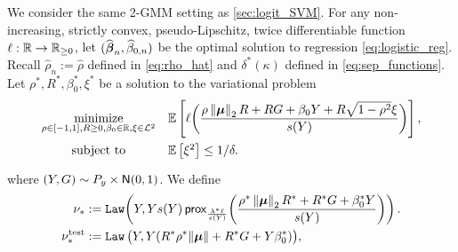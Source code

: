 We consider the same 2-GMM setting as \cref{sec:logit_SVM}. For any non-increasing, strictly convex, pseudo-Lipschitz, twice differentiable function $\ell: \mathbb{R} \to \mathbb{R}_{\ge 0}$, let $(\widehat {{\boldsymbol{\beta}}}_n, \widehat \beta_{0, n})$ be the optimal solution to regression \cref{eq:logistic_reg}. Recall $\hat \rho_n:= \hat \rho$ defined in \cref{eq:rho_hat} and $\delta^*(\kappa)$ defined in \cref{eq:sep_functions}. Let $\rho^*, R^*, \beta_0^*, \xi^*$ be a solution to the variational problem
    \begin{equation}\label{eq:logistic_variation}
    \begin{aligned}
        \begin{array}{cl}
            \underset{ \rho \in [-1, 1], R \ge 0, \beta_0 \in \mathbb{R},\xi \in \mathcal{L}^2 }{ \mathrm{minimize} }
            &
        \mathbb{E} \left[ \ell \biggl( \dfrac{ \rho\left\|{{\boldsymbol{\mu}}}\right\|_2 R + RG + \beta_0 Y + R\sqrt{1 - \rho^2} \xi }{s(Y)} \biggr) \right], \\
            \text{subject to} & \vphantom{\dfrac11} \mathbb{E} \left[ \xi^2 \right]  \le  1/\delta .
        \end{array}
    \end{aligned}
    \end{equation}
    where $(Y, G) \sim P_y \times {\sf N}(0,1)$. 
    We define
    \begin{equation*}
    \begin{aligned}
        \nu_* & := 
        \mathtt{Law} \!\left( 
        Y, Ys(Y) \, \mathsf{prox}_{\frac{\lambda^* \ell}{s(Y)}}\biggl( \frac{\rho^* \left\|{{\boldsymbol{\mu}}}\right\|_2 R^* + R^* G + \beta_0^* Y}{s(Y)} \biggr)
        \right).
        \\
        \nu^\mathrm{test}_* & := \mathtt{Law} \,\bigl( Y, Y ( R^*\rho^* \| \text{\boldmath $\mu$} \| + R^*G + Y \beta_0^*) \bigr),
    \end{aligned}
    \end{equation*}
